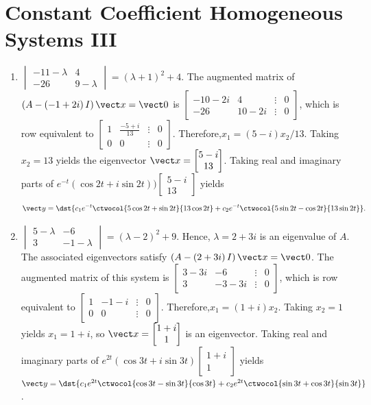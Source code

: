 \documentclass[openany]{book}
\newenvironment{sectionSolutions}{
 \begin{enumerate}[item-label={\thesection.\arabic{enumi}.}]
}{
 \end{enumerate}
}
\begin{document}
\section{Constant Coefficient Homogeneous Systems III}

\begin{sectionSolutions}
\item
$\begin{vmatrix}-11-\lambda&4\\-26&9-\lambda
\end{vmatrix}=(\lambda+1)^2+4$.
The augmented matrix of
$\left(A-\left(-1+2i\right)I\right){\vect x}={\vect 0}$ is
$\begin{bmatrix}-10-2i&4&\vdots&0\\
-26&10-2i&\vdots&0 \end{bmatrix}$,
which is row equivalent to
$\begin{bmatrix} 1&\frac{-5+i}{13}&\vdots&0\\
0&0&\vdots&0
\end{bmatrix}$.
Therefore,$x_1=(5-i)x_2/13$. Taking $x_2=13$ yields the eigenvector
${\vect x}=\begin{bmatrix}5-i\\13\end{bmatrix}$.
Taking  real and imaginary parts of
$e^{-t}(\cos2t+i\sin2t)
)\begin{bmatrix}5-i\\13\end{bmatrix}$ yields
\[
 {\vect y}=\dst{c_1e^{-t}\ctwocol{5\cos2t+\sin2t}{13\cos2t}
+c_2e^{-t}\ctwocol{5\sin2t-\cos2t}{13\sin2t}}.
\]


\item
$\begin{vmatrix} 5-\lambda&-6\\ 3&-1-\lambda
\end{vmatrix}=(\lambda-2)^2+9$.
Hence, $\lambda=2+3i$ is an eigenvalue of $A$. The associated
eigenvectors satisfy $\left(A-\left(2+3i\right)I\right){\vect x}={\vect
0}$. The augmented matrix of this system is
$\begin{bmatrix} 3-3i&-6&\vdots&0\\
3&-3-3i&\vdots&0  \end{bmatrix}$,
which is row equivalent to
$\begin{bmatrix} 1&-1-i&\vdots&0\\
0&0&\vdots&0
\end{bmatrix}$.
Therefore,$x_1=(1+i)x_2$. Taking $x_2=1$ yields $x_1=1+i$, so
${\vect x}=\begin{bmatrix}1+i\\1\end{bmatrix}$
is an eigenvector.  Taking  real and imaginary parts of
$e^{2t}(\cos3t+i\sin3t)
\begin{bmatrix}1+i\\1\end{bmatrix}$ yields
 ${\vect y}=\dst{c_1e^{2t}\ctwocol{\cos3t-\sin3t}{\cos3t}
+c_2e^{2t}\ctwocol{\sin3t+\cos3t}{\sin3t}}$.



\end{sectionSolutions}
\end{document}
